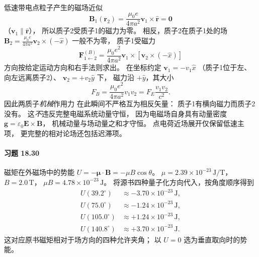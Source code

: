 低速带电点粒子产生的磁场近似
\[
 \boldsymbol B_1(\boldsymbol r_2)=
 \frac{\mu_0e}{4\pi a^2}
 \boldsymbol v_1\times\hat{\boldsymbol r}=\boldsymbol0
\]
（\(\boldsymbol v_1\parallel\hat{\boldsymbol r}\)），
所以质子2受质子1的磁力为零。
相反，质子2在质子1处的场
\(\boldsymbol B_2=
 \frac{\mu_0e}{4\pi a^2}
 \boldsymbol v_2\times(-\hat x)\)
一般不为零，
质子1受磁力
\[
 \boxed{\boldsymbol F_{1\leftarrow2}^{(B)}
 =\frac{\mu_0e^2}{4\pi a^2}
 \boldsymbol v_1\times[
 \boldsymbol v_2\times(-\hat x)]}
\]
方向按给定运动方向和右手法则求出。
在坐标约定
\(\boldsymbol v_1=-v_1\hat x\)
（质子1位于左、向左远离质子2）、
\(\boldsymbol v_2=+v_2\hat y\) 下，
磁力沿 \(+\hat y\)，其大小
\[
 \boxed{F_B=\frac{\mu_0e^2}{4\pi a^2}v_1v_2
 =F_E\frac{v_1v_2}{c^2}}.
\]
因此两质子\emph{机械}作用力
在此瞬间不严格互为相反矢量：
质子1有横向磁力而质子2没有。
这\emph{不}违反完整电磁系统动量守恒，
因为电磁场自身具有动量密度
\(\boldsymbol g=\varepsilon_0
 \boldsymbol E\times\boldsymbol B\)，
机械动量与场动量之和才守恒。
点电荷近场展开仅保留低速主项，
更完整的相对论场还包括迟滞项。

\paragraph{习题 18.30}
磁矩在外磁场中的势能
\(U=-\boldsymbol\mu\cdot\boldsymbol B
 =-\mu B\cos\theta\)。
\(\mu=2.39\times10^{-23}\,\mathrm{J/T}\)，
\(B=2.0\,\mathrm T\)，
\(\mu B=4.78\times10^{-23}\,\mathrm J\)。
将源书四种量子化方向代入，按角度顺序得到
\[
 \boxed{\begin{aligned}
 U(39.2^\circ)&\approx-3.70\times10^{-23}\,\mathrm J,\\
 U(75.0^\circ)&\approx-1.24\times10^{-23}\,\mathrm J,\\
 U(105.0^\circ)&\approx+1.24\times10^{-23}\,\mathrm J,\\
 U(140.8^\circ)&\approx+3.70\times10^{-23}\,\mathrm J.
 \end{aligned}}
\]
这对应原书磁矩相对于场方向的四种允许夹角；
以 \(U=0\) 选为垂直取向时的势能。
